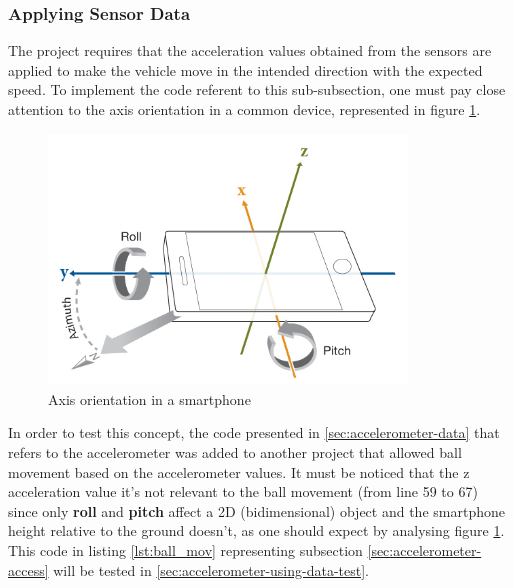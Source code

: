 %

%
\subsubsection{Applying Sensor Data}
\label{sec:using-accelerometer-data}
%
The project requires that the acceleration values obtained from the sensors are applied to make the vehicle move in the intended direction with the expected speed. 
%
To implement the code referent to this sub-subsection, one must pay close attention to the axis orientation in a common device, represented in figure \ref{fig:axis-smartphone}.
%
\begin{figure}[!h]
\centering
\includegraphics[width=0.85\textwidth]{img/smartphone_axis.png}
\caption{\label{fig:axis-smartphone}Axis orientation in a smartphone}
\end{figure}
%
In order to test this concept, the code presented in \ref{sec:accelerometer-data} that refers to the accelerometer was added to another project that allowed ball movement based on the accelerometer values. It must be noticed that the z acceleration value it's not relevant to the ball movement (from line 59 to 67) since only \textbf{roll} and \textbf{pitch} affect a 2D (bidimensional) object and the smartphone height relative to the ground doesn't, as one should expect by analysing figure \ref{fig:axis-smartphone}.
%
This code in listing \ref{lst:ball_mov} representing subsection \ref{sec:accelerometer-access} will be tested in \ref{sec:accelerometer-using-data-test}.\\
%

%